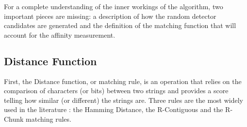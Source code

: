 For a complete understanding of the inner workings of the algorithm, two important pieces are missing: a description of how the random detector candidates are generated and the definition of the matching function that will account for the affinity measurement.

\subsection{Distance Function} \label{sec:bgNSADistance}


First, the Distance function, or matching rule, is an operation that relies on the comparison of characters (or bits) between two strings and provides a score telling how similar (or different) the strings are. Three rules are the most widely used in the literature \cite{EffectBinaryRule2003}: the Hamming Distance, the R-Contiguous and the R-Chunk matching rules. 



